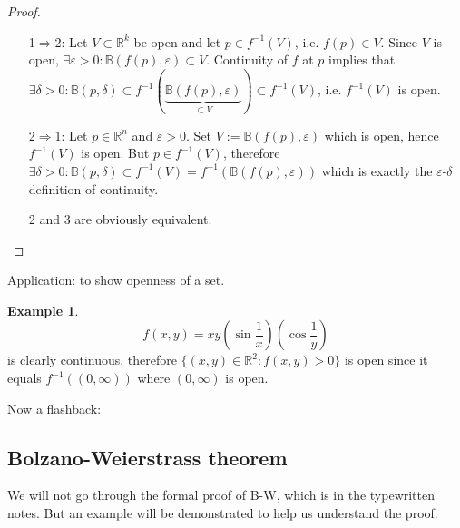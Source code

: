 \documentclass[a4paper]{article}
\theoremstyle{definition}
\newtheorem{eg}[defn]{Example}
\begin{document}
\begin{proof}
\begin{itemize}
    \item[1$\Rightarrow$2:] Let $V\subset \mathbb R^k$ be open and let $p\in f^{-1}(V)$, i.e. $f(p)\in V$. Since $V$ is open, $\exists \varepsilon >0 : \mathbb B(f(p),\varepsilon) \subset V$. Continuity of $f$ at $p$ implies that $\exists \delta >0:\mathbb B(p,\delta)\subset f^{-1}(\underbrace{\mathbb B(f(p),\varepsilon)}_{\subset V})\subset f^{-1}(V)$, i.e. $f^{-1}(V)$ is open.
    \item[2$\Rightarrow$1:] Let $p\in \mathbb R^n$ and $\varepsilon >0$. Set $V:=\mathbb B(f(p),\varepsilon)$ which is open, hence $f^{-1}(V)$ is open. But $p\in f^{-1}(V)$, therefore $\exists \delta >0 : \mathbb B(p,\delta) \subset f^{-1}(V)=f^{-1} (\mathbb B (f(p),\varepsilon))$ which is exactly the $\varepsilon$-$\delta$ definition of continuity.
    \item[] 2 and 3 are obviously equivalent.
\end{itemize}
\end{proof}

Application: to show openness of a set.
\begin{eg}
\[
f(x,y)=xy\left(\sin \frac1x \right)\left(\cos \frac1y \right)
\]
is clearly continuous, therefore $\{(x,y)\in \mathbb R^2 : f(x,y)>0\}$ is open since it equals $f^{-1}((0,\infty))$ where $(0,\infty)$ is open.
\end{eg}

Now a flashback:
\subsection{Bolzano-Weierstrass theorem}
We will not go through the formal proof of B-W, which is in the typewritten notes. But an example will be demonstrated to help us understand the proof.
\end{document}
